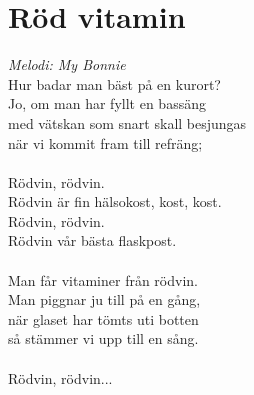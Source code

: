 \section{Röd vitamin}
\textit{Melodi: My Bonnie}
\vspace{2mm}\\
Hur badar man bäst på en kurort?\\
Jo, om man har fyllt en bassäng\\
med vätskan som snart skall besjungas\\
när vi kommit fram till refräng;\\
\\
Rödvin, rödvin.\\
Rödvin är fin hälsokost, kost, kost.\\
Rödvin, rödvin.\\
Rödvin vår bästa flaskpost.\\
\\
Man får vitaminer från rödvin.\\
Man piggnar ju till på en gång,\\
när glaset har tömts uti botten\\
så stämmer vi upp till en sång.\\
\\
Rödvin, rödvin...\\
